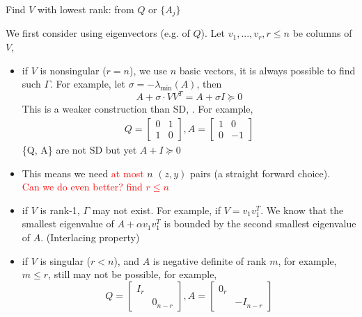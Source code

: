 \documentclass[aspectratio=1610, 9pt]{beamer}
\newcommand{\red}[1]{\textcolor{red}{#1}}
\begin{document}
\begin{frame}[allowframebreaks]{Find \(V\) with lowest rank: from \(Q\) or \(\{A_j\}\)}

  We first consider using eigenvectors (e.g. of \(Q\)). Let \(v_1, ..., v_r, r \le n\) be columns of \(V\),

  \begin{itemize}
    \item if \(V\) is nonsingular (\(r = n\)), we use \(n\) basic vectors, it is always possible to find such \(\Gamma\). For example, let \(\sigma = - \lambda_{\min} (A)\), then
          \[A + \sigma \cdot VV^T = A + \sigma I \succeq 0\]
          This is a weaker construction than SD, \cite{jiang_simultaneous_2016}. For example,
          \begin{align*}
            Q = \begin{bmatrix}0 & 1 \\ 1 & 0\end{bmatrix}, A = \begin{bmatrix}1 & 0 \\ 0 & -1\end{bmatrix}
          \end{align*}
          \{Q, A\} are not SD but yet \(A + I \succeq 0\)

    \item This means we need \red{at most} \(n\) \((z, y)\) pairs (a straight forward choice).\\
          \red{Can we do even better? find \(r \le n\)}
          \framebreak
    \item if \(V\) is rank-1, \(\Gamma\) may not exist. For example, if \(V = v_1v_1^T\). We know that the smallest eigenvalue of \(A + \alpha v_1v_1^T\) is bounded by the second smallest eigenvalue of \(A\). (Interlacing property)


    \item if \(V\) is singular (\(r < n\)), and \(A\) is negative definite of rank \(m\), for example, \(m \le r\), still may not be possible, for example,
          \[Q = \begin{bmatrix}I_r & \\ & 0_{n-r} \end{bmatrix}, A = \begin{bmatrix}0_r & \\ & - I_{n-r} \end{bmatrix}\]
  \end{itemize}

  \framebreak


\end{frame}
\end{document}
